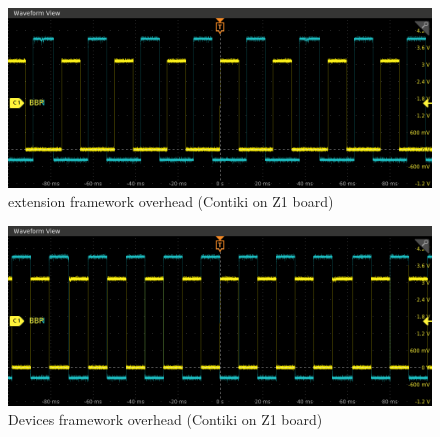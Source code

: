 \documentclass{beamer}
\begin{document}
\begin{frame}
  \begin{figure}
    \includegraphics[scale=0.4]{assets/extension-framework-overhead-contiki-z1.png}
    \caption{extension framework overhead (Contiki on Z1 board)}
  \end{figure}
\end{frame}
  
  
\begin{frame}
  \begin{figure}
    \includegraphics[scale=0.4]{assets/devices-framework-overhead-contiki-z1.png}
    \caption{Devices framework overhead (Contiki on Z1 board)}
  \end{figure}
\end{frame}
  
\end{document}
